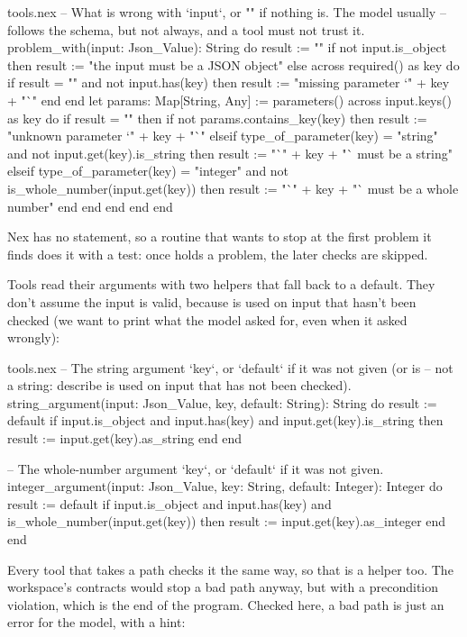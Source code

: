 \begin{continued}{tools.nex}
  -- What is wrong with `input`, or "" if nothing is. The model usually
  -- follows the schema, but not always, and a tool must not trust it.
  problem_with(input: Json_Value): String do
    result := ""
    if not input.is_object then
      result := "the input must be a JSON object"
    else
      across required() as key do
        if result = "" and not input.has(key) then
          result := "missing parameter `" + key + "`"
        end
      end
      let params: Map[String, Any] := parameters()
      across input.keys() as key do
        if result = "" then
          if not params.contains_key(key) then
            result := "unknown parameter `" + key + "`"
          elseif type_of_parameter(key) = "string" and not input.get(key).is_string then
            result := "`" + key + "` must be a string"
          elseif type_of_parameter(key) = "integer" and not is_whole_number(input.get(key)) then
            result := "`" + key + "` must be a whole number"
          end
        end
      end
    end
  end
\end{continued}

Nex has no  statement, so a routine that wants to stop at the
first problem it finds does it with a test: once  holds a
problem, the later checks are skipped.

Tools read their arguments with two helpers that fall back to a default.
They don't assume the input is valid, because  is used on
input that hasn't been checked (we want to print what the model asked for,
even when it asked wrongly):

\begin{continued}{tools.nex}
  -- The string argument `key`, or `default` if it was not given (or is
  -- not a string: describe is used on input that has not been checked).
  string_argument(input: Json_Value, key, default: String): String do
    result := default
    if input.is_object and input.has(key) and input.get(key).is_string then
      result := input.get(key).as_string
    end
  end

  -- The whole-number argument `key`, or `default` if it was not given.
  integer_argument(input: Json_Value, key: String, default: Integer): Integer do
    result := default
    if input.is_object and input.has(key) and is_whole_number(input.get(key)) then
      result := input.get(key).as_integer
    end
  end
\end{continued}

Every tool that takes a path checks it the same way, so that is a helper
too. The workspace's contracts would stop a bad path anyway, but with a
precondition violation, which is the end of the program. Checked here, a
bad path is just an error for the model, with a hint:

